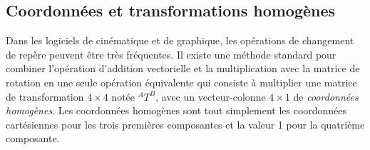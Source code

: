 \subsection{Coordonnées et transformations homogènes}
\label{sec:coordhomo}

Dans les logiciels de cinématique et de graphique, les opérations de changement de repère peuvent être très fréquentes. Il existe une méthode standard pour combiner l'opération d'addition vectorielle et la multiplication avec la matrice de rotation en une seule opération équivalente qui consiste à multiplier une matrice de transformation $4\times4$ notée $^AT^B$, avec un vecteur-colonne $4\times1$ de \textit{coordonnées homogènes}. Les coordonnées homogènes sont tout simplement les coordonnées cartésiennes pour les trois premières composantes et la valeur 1 pour la quatrième composante.

